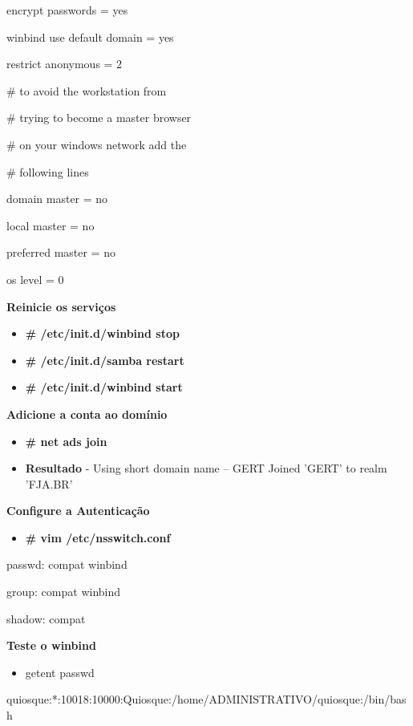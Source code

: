         encrypt passwords = yes

        winbind use default domain = yes

        restrict anonymous = 2

\# to avoid the workstation from

\# trying to become a master browser

\# on your windows network add the

\# following lines

        domain master = no

        local master = no

        preferred master = no

        os level = 0

\textbf{Reinicie os serviços}

\begin{itemize}
	\item \textbf{\# /etc/init.d/winbind stop}
	\item \textbf{\# /etc/init.d/samba restart}
	\item \textbf{\# /etc/init.d/winbind start}
\end{itemize}

\textbf{Adicione a conta ao domínio}

\begin{itemize}
	\item \textbf{\# net ads join}
	\item \textbf{Resultado} - Using short domain name – GERT Joined 'GERT' to realm 'FJA.BR'
\end{itemize}

\textbf{Configure a Autenticação}

\begin{itemize}
	\item \textbf{\# vim /etc/nsswitch.conf}
\end{itemize}

	passwd:         compat winbind

	group:          compat winbind

	shadow:         compat

\textbf{Teste o winbind}

\begin{itemize}
	\item {getent passwd}
\end{itemize}

quiosque:*:10018:10000:Quiosque:/home/ADMINISTRATIVO/quiosque:/bin/bash

